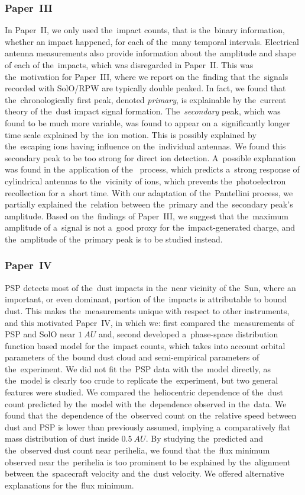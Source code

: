 \subsubsection{Paper~III}

In Paper~II, we only used the~impact counts, that is the~binary information, whether an impact happened, for each of the~many temporal intervals. Electrical antenna measurements also provide information about the~amplitude and shape of each of the~impacts, which was disregarded in Paper~II. This was the~motivation for Paper~III, where we report on the~finding that the~signals recorded with SolO/RPW are typically double peaked. In fact, we found that the~chronologically first peak, denoted \textit{primary}, is explainable by the~current theory of the~dust impact signal formation. The~\textit{secondary} peak, which was found to be much more variable, was found to appear on a~significantly longer time scale explained by the~ion motion. This is possibly explained by the~escaping ions having influence on the~individual antennas. We found this secondary peak to be too strong for direct ion detection. A~possible explanation was found in the~application of the~\citet{pantellini2012nano} process, which predicts a~strong response of cylindrical antennas to the~vicinity of ions, which prevents the~photoelectron recollection for a~short time. With our adaptation of the~Pantellini process, we partially explained the~relation between the~primary and the~secondary peak's amplitude. Based on the~findings of Paper~III, we suggest that the~maximum amplitude of a~signal is not a~good proxy for the~impact-generated charge, and the~amplitude of the~primary peak is to be studied instead. 

\subsubsection{Paper~IV}

PSP detects most of the~dust impacts in the~near vicinity of the~Sun, where an important, or even dominant, portion of the~impacts is attributable to bound dust. This makes the~measurements unique with respect to other instruments, and this motivated Paper~IV, in which we: first compared the~measurements of PSP and SolO near $\SI{1}{AU}$ and, second developed a~phase-space distribution function based model for the~impact counts, which takes into account orbital parameters of the~bound dust cloud and semi-empirical parameters of the~experiment. We did not fit the~PSP data with the~model directly, as the~model is clearly too crude to replicate the~experiment, but two general features were studied. We compared the~heliocentric dependence of the~dust count predicted by the~model with the~dependence observed in the~data. We found that the~dependence of the~observed count on the~relative speed between dust and PSP is lower than previously assumed, implying a~comparatively flat mass distribution of dust inside $\SI{0.5}{AU}$. By studying the~predicted and the~observed dust count near perihelia, we found that the~flux minimum observed near the~perihelia is too prominent to be explained by the~alignment between the~spacecraft velocity and the~dust velocity. We offered alternative explanations for the~flux minimum. 
